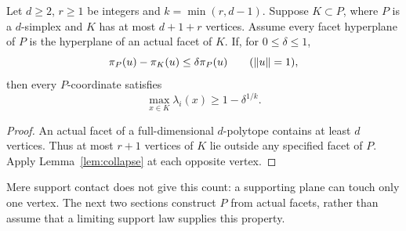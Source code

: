 \begin{corollary}\label{cor:caps}
Let $d\ge2$, $r\ge1$ be integers and $k=\min(r,d-1)$. Suppose $K\subset P$,
where $P$ is a $d$-simplex and $K$ has at most $d+1+r$ vertices. Assume
every facet hyperplane of $P$ is the hyperplane of an actual facet of $K$.
If, for $0\le\delta\le1$,
\[
 \pi_P(u)-\pi_K(u)\le\delta\pi_P(u)\qquad(\lVert u\rVert=1),
\]
then every $P$-coordinate satisfies
\begin{equation}\label{eq:caps}
 \max_{x\in K}\lambda_i(x)\ge1-\delta^{1/k}.
\end{equation}
\end{corollary}
\begin{proof}
An actual facet of a full-dimensional $d$-polytope contains at least $d$
vertices. Thus at most $r+1$ vertices of $K$ lie outside any specified
facet of $P$. Apply Lemma~\ref{lem:collapse} at each opposite vertex.
\end{proof}
Mere support contact does not give this count: a supporting plane can touch
only one vertex. The next two sections construct $P$ from actual facets,
rather than assume that a limiting support law supplies this property.
